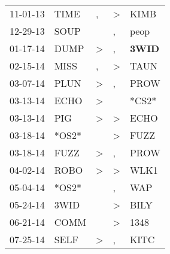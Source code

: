 \begin{supertabular}{p{0.07\textwidth}p{0.06\textwidth}p{0.02\textwidth}p{0.02\textwidth}p{0.06\textwidth}}
          11-01-13\textsuperscript{} &           TIME\textsuperscript{} &                , &     \textgreater &           KIMB\textsuperscript{} \\
          12-29-13\textsuperscript{} &           SOUP\textsuperscript{} &                  &                , &           peop\textsuperscript{} \\
          01-17-14\textsuperscript{} &           DUMP\textsuperscript{} &     \textgreater &                , &  \textbf{3WID\textsuperscript{}} \\
          02-15-14\textsuperscript{} &           MISS\textsuperscript{} &                , &     \textgreater &           TAUN\textsuperscript{} \\
          03-07-14\textsuperscript{} &           PLUN\textsuperscript{} &     \textgreater &                , &           PROW\textsuperscript{} \\
          03-13-14\textsuperscript{} &           ECHO\textsuperscript{} &     \textgreater &                  &                            *CS2* \\
          03-13-14\textsuperscript{} &            PIG\textsuperscript{} &     \textgreater &     \textgreater &           ECHO\textsuperscript{} \\
          03-18-14\textsuperscript{} &                            *OS2* &                  &     \textgreater &           FUZZ\textsuperscript{} \\
          03-18-14\textsuperscript{} &           FUZZ\textsuperscript{} &     \textgreater &                , &           PROW\textsuperscript{} \\
          04-02-14\textsuperscript{} &           ROBO\textsuperscript{} &     \textgreater &     \textgreater &           WLK1\textsuperscript{} \\
          05-04-14\textsuperscript{} &                            *OS2* &                  &                , &            WAP\textsuperscript{} \\
          05-24-14\textsuperscript{} &           3WID\textsuperscript{} &                  &     \textgreater &           BILY\textsuperscript{} \\
          06-21-14\textsuperscript{} &           COMM\textsuperscript{} &                  &     \textgreater &           1348\textsuperscript{} \\
          07-25-14\textsuperscript{} &           SELF\textsuperscript{} &     \textgreater &                , &           KITC\textsuperscript{} \\

\end{supertabular}
